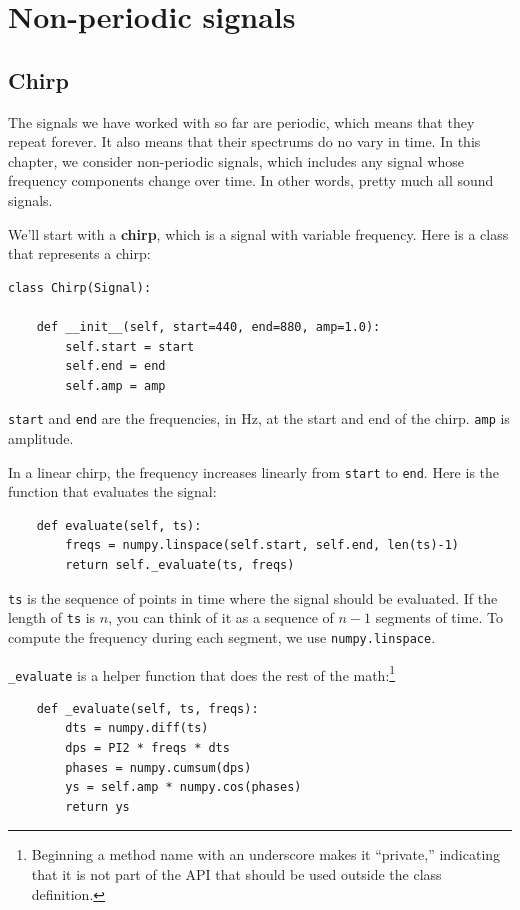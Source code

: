 \documentclass[12pt]{book}
\begin{document}
\chapter{Non-periodic signals}


\section{Chirp}

The signals we have worked with so far are periodic, which means
that they repeat forever.  It also means that their spectrums do
no vary in time.  In this chapter, we consider non-periodic signals,
which includes any signal whose frequency components change over time.
In other words, pretty much all sound signals.

We'll start with a {\bf chirp}, which is a signal with variable
frequency.  Here is a class that represents a chirp:

\begin{verbatim}
class Chirp(Signal):
    
    def __init__(self, start=440, end=880, amp=1.0):
        self.start = start
        self.end = end
        self.amp = amp
\end{verbatim}

{\tt start} and {\tt end} are the frequencies, in Hz, at the start
and end of the chirp.  {\tt amp} is amplitude.

In a linear chirp, the frequency increases linearly from {\tt start}
to {\tt end}.  Here is the function that evaluates the signal:

\begin{verbatim}
    def evaluate(self, ts):
        freqs = numpy.linspace(self.start, self.end, len(ts)-1)
        return self._evaluate(ts, freqs)
\end{verbatim}

{\tt ts} is the sequence of points in time where the signal should
be evaluated.  If the length of {\tt ts} is $n$, you can think of
it as a sequence of $n-1$ segments of time.  To compute the frequency
during each segment, we use {\tt numpy.linspace}.

\verb"_evaluate" is a helper function that does the rest of the
math:\footnote{Beginning a method name with an underscore makes it
``private,'' indicating that it is not part of the API that should
be used outside the class definition.}

\begin{verbatim}
    def _evaluate(self, ts, freqs):
        dts = numpy.diff(ts)
        dps = PI2 * freqs * dts
        phases = numpy.cumsum(dps)
        ys = self.amp * numpy.cos(phases)
        return ys
\end{verbatim}
\end{document}
